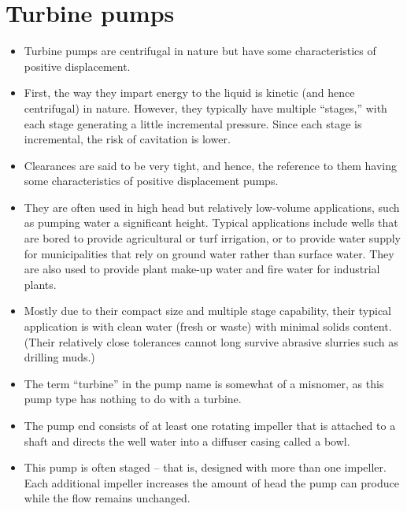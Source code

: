 \section{Turbine pumps}
\begin{itemize}

\item Turbine pumps are centrifugal in nature but have some characteristics of positive displacement. 

\item First, the way they impart energy to the liquid is kinetic (and hence centrifugal) in nature. However, they typically have multiple “stages,” with each stage generating a little incremental pressure. Since each stage is incremental, the risk of cavitation is lower.

\item Clearances are said to be very tight, and hence, the reference to them having some characteristics of positive displacement pumps.

\item They are often used in high head but relatively low-volume applications, such as pumping water a significant height.  Typical applications include wells that are bored to provide agricultural or turf irrigation, or to provide water supply for municipalities that rely on ground water rather than surface water. They are also used to provide plant make-up water and fire water for industrial plants.

\item Mostly due to their compact size and multiple stage capability, their typical application is with clean water (fresh or waste) with minimal solids content. (Their relatively close tolerances cannot long survive abrasive slurries such as drilling muds.)

\item The term “turbine” in the pump name is somewhat of a misnomer, as this pump type has nothing to do with a turbine.

\item The pump end consists of at least one rotating impeller that is attached to a shaft and directs the well water into a diffuser casing called a bowl.

\item This pump is often staged – that is, designed with more than one impeller. Each additional impeller increases the amount of head the pump can produce while the flow remains unchanged.


\end{itemize}
